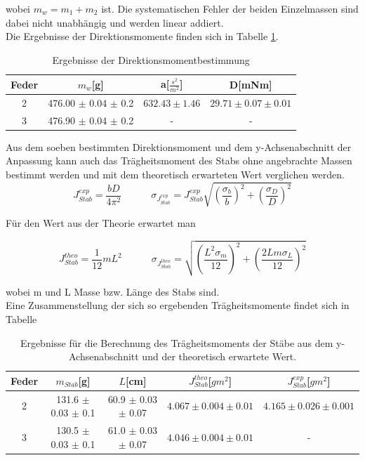 \documentclass[12pt,a4paper]{article}
\begin{document}
wobei $m_w=m_1+m_2$ ist. Die systematischen Fehler der beiden Einzelmassen sind dabei nicht unabhängig und werden linear addiert.\\
Die Ergebnisse der Direktionsmomente finden sich in Tabelle \ref{tab:Direktionsmomente}.

\begin{table}
\caption{Ergebnisse der Direktionsmomentbestimmung}
\begin{center}
\begin{tabular}{|c|c|c|c|}
\hline
Feder & $m_w$[g] & a[$\frac{s^2}{m^2}$] & D[mNm]\\
\hline
2 & 476.00 $\pm$ 0.04 $\pm$ 0.2 & $632.43 \pm 1.46$ & $29.71 \pm 0.07 \pm 0.01$ \\
\hline
3 & 476.90 $\pm$ 0.04 $\pm$ 0.2 & - &  - \\
\hline
\end{tabular}
\end{center}
\label{tab:Direktionsmomente}
\end{table}

Aus dem soeben bestimmten Direktionsmoment und dem y-Achsenabschnitt der Anpassung kann auch das Trägheitsmoment des Stabs ohne angebrachte Massen bestimmt werden und mit dem theoretisch erwarteten Wert verglichen werden.\\

\begin{equation}
J_{Stab}^{exp}=\frac{bD}{4\pi^2} \quad \quad \quad
\sigma_{J_{Stab}^{exp}}=J_{Stab}^{exp} \sqrt{(\frac{\sigma_b}{b})^2+(\frac{\sigma_D}{D})^2}
\end{equation}

Für den Wert aus der Theorie erwartet man

\begin{equation}
J_{Stab}^{theo}=\frac{1}{12} m L^2 \quad \quad \quad
\sigma_{J_{Stab}^{theo}}=\sqrt{(\frac{L^2 \sigma_m}{12})^2+(\frac{2Lm\sigma_L}{12})^2}
\end{equation}

wobei m und L Masse bzw. Länge des Stabs sind.\\
Eine Zusammenstellung der sich so ergebenden Trägheitsmomente findet sich in Tabelle


\begin{table}
\caption{Ergebnisse für die Berechnung des Trägheitsmoments der Stäbe aus dem y-Achsenabschnitt und der theoretisch erwartete Wert.}
\label{tab:TrägTheoExp}
\begin{center}
\begin{tabular}{|c|c|c|c|c|}
\hline
Feder & $m_{Stab}$[g] & $L$[cm] & $J_{Stab}^{theo}$[$g m^2$] & $J_{Stab}^{exp}$[$g m^2$]\\
\hline
2 & 131.6 $\pm$ 0.03 $\pm$ 0.1 & 60.9 $\pm$ 0.03 $\pm$ 0.07 & $4.067 \pm 0.004 \pm 0.01 $ & $ 4.165 \pm 0.026 \pm 0.001 $ \\
\hline
3 & 130.5 $\pm$ 0.03 $\pm$ 0.1 & 61.0 $\pm$ 0.03 $\pm$ 0.07 & $4.046 \pm 0.004 \pm  0.01 $ & - \\
\hline
\end{tabular}
\end{center}
\end{table}
\end{document}
